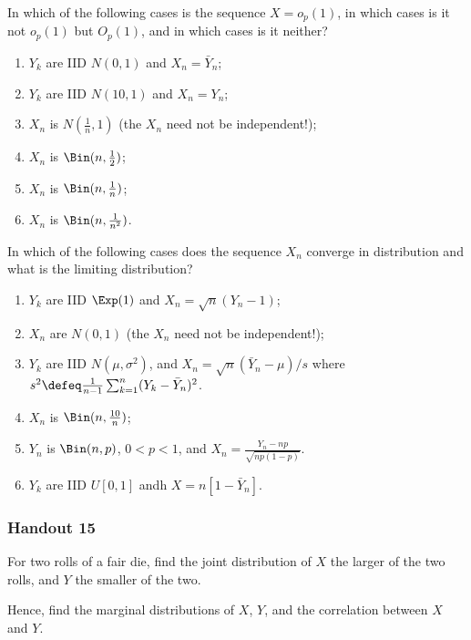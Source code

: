 \begin{problem}[Handout 14-II, \# 3]
  In which of the following cases is the sequence \(X=o_p(1)\), in which
  cases is it not \(o_p(1)\) but \(O_p(1)\), and in which cases is it
  neither?
  \begin{enumerate}[label=(\alph*),noitemsep]
  \item \(Y_k\) are IID \(N(0,1)\) and \(X_n=\bar Y_n\);
  \item \(Y_k\) are IID \(N(10,1)\) and \(X_n=Y_n\);
  \item \(X_n\) is \(N(\frac{1}{n},1)\) (the \(X_n\) need not be
    independent!);
  \item \(X_n\) is \(\Bin(n,\frac{1}{2})\);
  \item \(X_n\) is \(\Bin(n,\frac{1}{n})\);
  \item \(X_n\) is \(\Bin(n,\frac{1}{n^2})\).
  \end{enumerate}
\end{problem}
\begin{solution*}
\end{solution*}

\begin{problem}[Handout 14-II, \# 7]
  In which of the following cases does the sequence \(X_n\) converge in
  distribution and what is the limiting distribution?
  \begin{enumerate}[label=(\alph*),noitemsep]
  \item \(Y_k\) are IID \(\Exp(1)\) and \(X_n=\sqrt{n}(Y_n-1)\);
  \item \(X_n\) are \(N(0,1)\) (the \(X_n\) need not be independent!);
  \item \(Y_k\) are IID \(N(\mu,\sigma^2)\), and \(X_n=\sqrt{n}(\bar
    Y_n-\mu)/s\) where \(s^2\defeq\frac{1}{n-1}\sum_{k=1}^n(Y_k-\bar
    Y_n)^2\).
  \item \(X_n\) is \(\Bin(n,\frac{10}{n})\);
    \item \(Y_n\) is \(\Bin(n,p)\), \(0<p<1\), and
      \(X_n=\frac{Y_n-np}{\sqrt{np(1-p)}}\).
    \item \(Y_k\) are IID \(U[0,1]\) andh \(X=n[1-\bar Y_n]\).
  \end{enumerate}
\end{problem}
\begin{solution*}
\end{solution*}

\subsubsection{Handout 15}
\begin{problem}[Handout 15, \# 2]
  For two rolls of a fair die, find the joint distribution of \(X\) the
  larger of the two rolls, and \(Y\) the smaller of the two.

  \noindent Hence, find the marginal distributions of \(X\), \(Y\), and the
  correlation between \(X\) and \(Y\).
\end{problem}
\begin{solution*}
\end{solution*}

